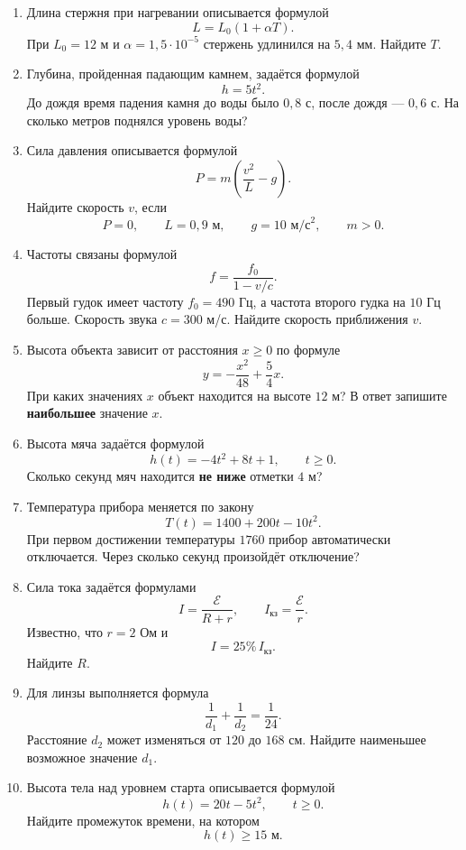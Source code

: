 \documentclass[a4paper,12pt]{article}
\begin{document}
\begin{enumerate}

  \item Длина стержня при нагревании описывается формулой
  \[
  L=L_0(1+\alpha T).
  \]
  При $L_0=12$ м и $\alpha=1{,}5\cdot10^{-5}$ стержень удлинился на $5{,}4$ мм. Найдите $T$.

  \item Глубина, пройденная падающим камнем, задаётся формулой
  \[
  h=5t^2.
  \]
  До дождя время падения камня до воды было $0{,}8$ с, после дождя --- $0{,}6$ с. На сколько метров поднялся уровень воды?

  \item Сила давления описывается формулой
  \[
  P=m\left(\frac{v^2}{L}-g\right).
  \]
  Найдите скорость $v$, если
  \[
  P=0,
  \qquad
  L=0{,}9\text{ м},
  \qquad
  g=10\text{ м/с}^2,
  \qquad
  m>0.
  \]

  \item Частоты связаны формулой
  \[
  f=\frac{f_0}{1-v/c}.
  \]
  Первый гудок имеет частоту $f_0=490$ Гц, а частота второго гудка на $10$ Гц больше. Скорость звука $c=300$ м/с. Найдите скорость приближения $v$.

  \item Высота объекта зависит от расстояния $x\ge0$ по формуле
  \[
  y=-\frac{x^2}{48}+\frac54x.
  \]
  При каких значениях $x$ объект находится на высоте $12$ м? В ответ запишите \textbf{наибольшее} значение $x$.

  \item Высота мяча задаётся формулой
  \[
  h(t)=-4t^2+8t+1,
  \qquad
  t\ge0.
  \]
  Сколько секунд мяч находится \textbf{не ниже} отметки $4$ м?

  \item Температура прибора меняется по закону
  \[
  T(t)=1400+200t-10t^2.
  \]
  При первом достижении температуры $1760$ прибор автоматически отключается. Через сколько секунд произойдёт отключение?

  \item Сила тока задаётся формулами
  \[
  I=\frac{\mathcal E}{R+r},
  \qquad
  I_{\text{кз}}=\frac{\mathcal E}{r}.
  \]
  Известно, что $r=2$ Ом и
  \[
  I=25\%\,I_{\text{кз}}.
  \]
  Найдите $R$.

  \item Для линзы выполняется формула
  \[
  \frac1{d_1}+\frac1{d_2}=\frac1{24}.
  \]
  Расстояние $d_2$ может изменяться от $120$ до $168$ см. Найдите наименьшее возможное значение $d_1$.

  \item Высота тела над уровнем старта описывается формулой
  \[
  h(t)=20t-5t^2,
  \qquad
  t\ge0.
  \]
  Найдите промежуток времени, на котором
  \[
  h(t)\ge15\text{ м}.
  \]

\end{enumerate}
\end{document}
